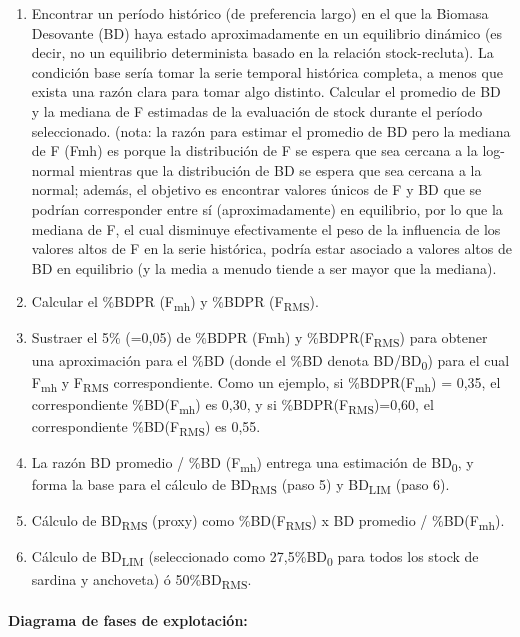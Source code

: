 \documentclass[
  spanish,
]{article}
\providecommand{\tightlist}{%
  \setlength{\itemsep}{0pt}\setlength{\parskip}{0pt}}
\begin{document}
\begin{enumerate}
\def\labelenumi{(\arabic{enumi})}
\tightlist
\item
  Encontrar un período histórico (de preferencia largo) en el que la
  Biomasa Desovante (BD) haya estado aproximadamente en un equilibrio
  dinámico (es decir, no un equilibrio determinista basado en la
  relación stock-recluta). La condición base sería tomar la serie
  temporal histórica completa, a menos que exista una razón clara para
  tomar algo distinto. Calcular el promedio de BD y la mediana de F
  estimadas de la evaluación de stock durante el período seleccionado.
  (nota: la razón para estimar el promedio de BD pero la mediana de F
  (Fmh) es porque la distribución de F se espera que sea cercana a la
  log-normal mientras que la distribución de BD se espera que sea
  cercana a la normal; además, el objetivo es encontrar valores únicos
  de F y BD que se podrían corresponder entre sí (aproximadamente) en
  equilibrio, por lo que la mediana de F, el cual disminuye
  efectivamente el peso de la influencia de los valores altos de F en la
  serie histórica, podría estar asociado a valores altos de BD en
  equilibrio (y la media a menudo tiende a ser mayor que la mediana).
\item
  Calcular el \%BDPR (F\textsubscript{mh}) y \%BDPR
  (F\textsubscript{RMS}).
\item
  Sustraer el 5\% (=0,05) de \%BDPR (Fmh) y \%BDPR(F\textsubscript{RMS})
  para obtener una aproximación para el \%BD (donde el \%BD denota
  BD/BD\textsubscript{0}) para el cual F\textsubscript{mh} y
  F\textsubscript{RMS} correspondiente. Como un ejemplo, si
  \%BDPR(F\textsubscript{mh}) = 0,35, el correspondiente
  \%BD(F\textsubscript{mh}) es 0,30, y si
  \%BDPR(F\textsubscript{RMS})=0,60, el correspondiente
  \%BD(F\textsubscript{RMS}) es 0,55.
\item
  La razón BD promedio / \%BD (F\textsubscript{mh}) entrega una
  estimación de BD\textsubscript{0}, y forma la base para el cálculo de
  BD\textsubscript{RMS} (paso 5) y BD\textsubscript{LIM} (paso 6).
\item
  Cálculo de BD\textsubscript{RMS} (proxy) como
  \%BD(F\textsubscript{RMS}) x BD promedio / \%BD(F\textsubscript{mh}).
\item
  Cálculo de BD\textsubscript{LIM} (seleccionado como
  27,5\%BD\textsubscript{0} para todos los stock de sardina y anchoveta)
  ó 50\%BD\textsubscript{RMS}.
\end{enumerate}

\hypertarget{diagrama-de-fases-de-explotaciuxf3n}{%
\paragraph{Diagrama de fases de
explotación:}\label{diagrama-de-fases-de-explotaciuxf3n}}
\end{document}
